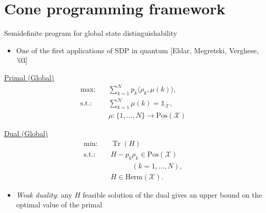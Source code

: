 \documentclass{beamer}
\def\I{\mathds{1}}
\newcommand{\ip}[2]{\langle #1 , #2\rangle}
\newcommand{\tr}{\operatorname{Tr}}
\def\X{\mathcal{X}}
\newcommand{\setft}[1]{\mathrm{#1}}
\newcommand{\Pos}{\setft{Pos}}
\newcommand{\Herm}{\setft{Herm}}
\begin{document}
  \section{Cone programming framework}

    \begin{frame}[t]{Semidefinite program for global state distinguishability}
        \begin{itemize}
          \item One of the first applications of SDP in quantum [Eldar, Megretski, Verghese, '03]
        \end{itemize}
        \vspace{10pt}
        \begin{minipage}[t]{0.48\linewidth}
            \begin{center}
            \underline{Primal (Global)}
            \begin{equation*}
              \begin{split}
                \text{max:} \quad & 
                \sum_{k=1}^{N} p_{k}\ip{\rho_{k}}{\mu(k)},\\
                \text{s.t.:} \quad & \sum_{k=1}^{N} \mu(k) = \I_{\X},\\
                  & \mu : \{1,\ldots, N\}\rightarrow \Pos(\X)
              \end{split}
            \end{equation*}
            \end{center}
        \end{minipage}\hfill
        \begin{minipage}[t]{0.48\linewidth}
            \begin{center}
            \underline{Dual (Global)}
            \vspace{10pt}
            \begin{equation*}
              \begin{split}
                \text{min:} \quad & \tr(H)\\
                \text{s.t.:} \quad & H-p_k\rho_k \in \Pos(\X)\\
                & \quad\qquad(k = 1,\ldots,N),\\
                \quad & H \in \Herm(\X).
              \end{split}
            \end{equation*}
            \end{center}
        \end{minipage}
        \vspace{10pt}
        \begin{itemize}
          \item \emph{Weak duality}: any $H$ feasible solution of the dual gives
            an upper bound on the optimal value of the primal  
        \end{itemize}
    \end{frame}
\end{document}
